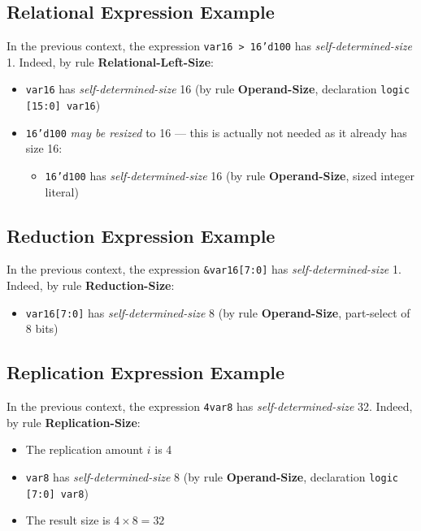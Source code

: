 \documentclass{article}
\newcommand{\sv}[1]{\texttt{#1}}
\newcommand{\sds}{\emph{self-determined-size}}
\newcommand{\mbr}{\emph{may be resized}}
\begin{document}
\subsection{Relational Expression Example}

In the previous context, the expression \sv{var16 > 16'd100} has
\sds{} 1. Indeed, by rule \textbf{Relational-Left-Size}:

\begin{itemize}
  \item \sv{var16} has \sds{} 16 (by rule
    \textbf{Operand-Size}, declaration \sv{logic [15:0] var16})
  \item \sv{16'd100} \mbr{} to 16 --- this is actually not
    needed as it already has size 16:
    \begin{itemize}
      \item \sv{16'd100} has \sds{} 16 (by rule
        \textbf{Operand-Size}, sized integer literal)
    \end{itemize}
\end{itemize}

\subsection{Reduction Expression Example}

In the previous context, the expression \sv{&var16[7:0]} has
\sds{} 1. Indeed, by rule \textbf{Reduction-Size}:

\begin{itemize}
  \item \sv{var16[7:0]} has \sds{} 8 (by rule
    \textbf{Operand-Size}, part-select of 8 bits)
\end{itemize}

\subsection{Replication Expression Example}

In the previous context, the expression \sv{{4{var8}}} has
\sds{} 32. Indeed, by rule \textbf{Replication-Size}:

\begin{itemize}
  \item The replication amount $i$ is 4
  \item \sv{var8} has \sds{} 8 (by rule
    \textbf{Operand-Size}, declaration \sv{logic [7:0] var8})
  \item The result size is $4 \times 8 = 32$
\end{itemize}
\end{document}
